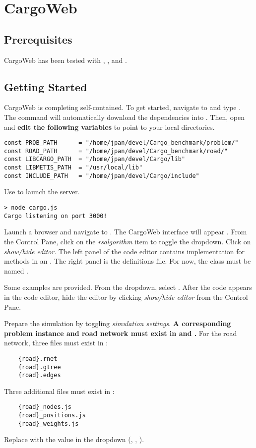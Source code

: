 \section{CargoWeb}

\subsection{Prerequisites}
CargoWeb has been tested with , ,
and .

\subsection{Getting Started}
CargoWeb is completing self-contained. To get started, navigate to
 and type  .
The command will automatically download the dependencies into
. Then, open  and
\textbf{edit the following variables} to point to your local directories.
\begin{verbatim}
const PROB_PATH      = "/home/jpan/devel/Cargo_benchmark/problem/"
const ROAD_PATH      = "/home/jpan/devel/Cargo_benchmark/road/"
const LIBCARGO_PATH  = "/home/jpan/devel/Cargo/lib"
const LIBMETIS_PATH  = "/usr/local/lib"
const INCLUDE_PATH   = "/home/jpan/devel/Cargo/include"
\end{verbatim}

Use  to launch the server.
\begin{verbatim}
> node cargo.js
Cargo listening on port 3000!
\end{verbatim}

Launch a browser and navigate to . The
CargoWeb interface will appear . From the
Control Pane, click on the \textit{rsalgorithm} item to toggle the dropdown.
Click on \textit{show/hide editor}. The left panel of the code editor
contains implementation for methods in an . The
right panel is the definitions file. For now, the class must be
named .

Some examples are provided. From the dropdown, select .
After the code appears in the code editor, hide the editor by clicking
\textit{show/hide editor} from the Control Pane.

Prepare the simulation by toggling \textit{simulation settings}. \textbf{A
corresponding problem instance and road network must exist in 
and .} For the road network, three files must exist in :
\begin{verbatim}
    {road}.rnet
    {road}.gtree
    {road}.edges
\end{verbatim}
Three additional files must exist in :
\begin{verbatim}
    {road}_nodes.js
    {road}_positions.js
    {road}_weights.js
\end{verbatim}
Replace  with the value in the  dropdown (,
, ).

